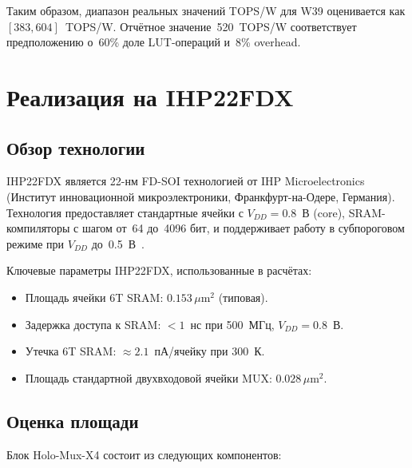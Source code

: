 Таким образом, диапазон реальных значений TOPS/W для W39
оценивается как $[383, 604]$~TOPS/W.
Отчётное значение~520~TOPS/W соответствует предположению
о~60\% доле LUT-операций и~8\% overhead.

\section{Реализация на IHP22FDX}
\label{sec:glava85-ihp22fdx}

\subsection{Обзор технологии}
\label{subsec:glava85-ihp22fdx-overview}

IHP22FDX является 22-нм FD-SOI технологией от IHP Microelectronics
(Институт инновационной микроэлектроники, Франкфурт-на-Одере, Германия).
Технология предоставляет стандартные ячейки с $V_{DD} = 0.8$~В (core),
SRAM-компиляторы с шагом от~64 до~4096 бит, и поддерживает
работу в субпороговом режиме при $V_{DD}$ до~0.5~В~\cite{trinity-fpga137}.

Ключевые параметры IHP22FDX, использованные в расчётах:
\begin{itemize}
  \item Площадь ячейки 6T SRAM: $0.153\,\mu\mathrm{m}^2$ (типовая).
  \item Задержка доступа к SRAM: $< 1$~нс при 500~МГц, $V_{DD} = 0.8$~В.
  \item Утечка 6T SRAM: $\approx 2.1$~пА/ячейку при 300~К.
  \item Площадь стандартной двухвходовой ячейки MUX: $0.028\,\mu\mathrm{m}^2$.
\end{itemize}

\subsection{Оценка площади}
\label{subsec:glava85-area-estimate}

Блок Holo-Mux-X4 состоит из следующих компонентов:

